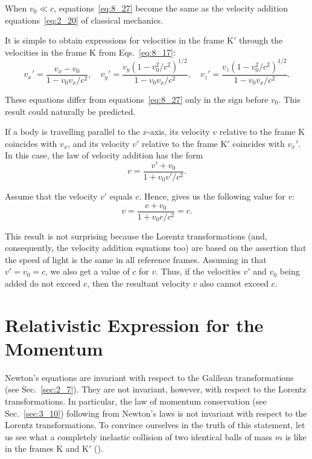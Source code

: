 \noindent
When $v_0\ll c$, equations~\eqref{eq:8_27} become the same as the velocity addition equations~\eqref{eq:2_20} of classical mechanics.

It is simple to obtain expressions for velocities in the frame K$'$ through the velocities in the frame K from Eqs.~\eqref{eq:8_17}:
\begin{equation}\label{eq:8_28}
	v_x' = \frac{v_x-v_0}{1 - v_0v_x/c^2},\quad  v_y' = \frac{v_y\left(1-v_0^2/c^2\right)^{1/2}}{1 - v_0v_x/c^2},\quad v_z' = \frac{v_z\left(1-v_0^2/c^2\right)^{1/2}}{1 - v_0v_x/c^2}.
\end{equation}

\noindent
These equations differ from equations~\eqref{eq:8_27} only in the sign before $v_0$. This result could naturally be predicted.

If a body is travelling parallel to the $x$-axis, its velocity $v$ relative to the frame K coincides with $v_x$, and its velocity $v'$ relative to the frame K$'$ coincides with $v_x'$. In this case, the law of velocity addition has the form
\begin{equation}\label{eq:8_29}
	v = \frac{v' + v_0}{1 + v_0 v'/c^2}.
\end{equation}

\noindent
Assume that the velocity $v'$ equals $c$. Hence,  gives us the following value for $v$:
\begin{equation*}
	v = \frac{c + v_0}{1 + v_0 c/c^2} = c.
\end{equation*}

\noindent
This result is not surprising because the Lorentz transformations (and, consequently, the velocity addition equations too) are based on the assertion that the speed of light is the same in all reference frames. Assuming in  that $v'=v_0=c$, we also get a value of $c$ for $v$. Thus, if the velocities $v'$ and $v_0$ being added do not exceed $c$, then the resultant velocity $v$ also cannot exceed $c$.

\section{Relativistic Expression for the Momentum}\label{sec:8_6}

Newton's equations are invariant with respect to the Galilean transformations (see Sec.~\ref{sec:2_7}). They are not invariant, however, with respect to the Lorentz transformations. In particular, the law of momentum conservation (see Sec.~\ref{sec:3_10}) following from Newton's laws is not invariant with respect to the Lorentz transformations. To convince ourselves in the truth of this statement, let us see what a completely inelastic collision of two identical balls of mass $m$ is like in the frames K and K$'$ ().

